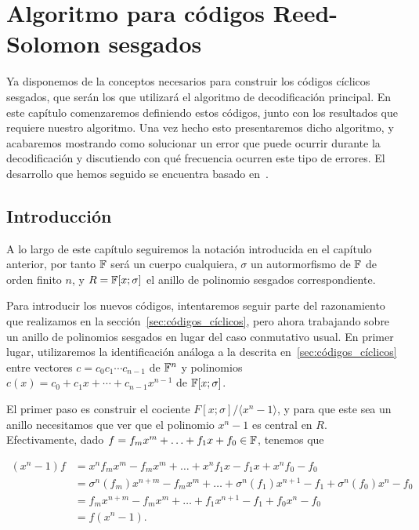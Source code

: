 \chapter{Algoritmo para códigos Reed-Solomon sesgados}%
\label{chap:algoritmo}

Ya disponemos de la conceptos necesarios para construir los códigos cíclicos sesgados, que serán los que utilizará el algoritmo de decodificación principal. En este capítulo comenzaremos definiendo estos códigos, junto con los resultados que requiere nuestro algoritmo. Una vez hecho esto presentaremos dicho algoritmo, y acabaremos mostrando como solucionar un error que puede ocurrir durante la decodificación y discutiendo con qué frecuencia ocurren este tipo de errores. El desarrollo que hemos seguido se encuentra basado en~\cite{sugi}.

\section{Introducción}

A lo largo de este capítulo seguiremos la notación introducida en el capítulo anterior, por tanto \(\mathbb{F}\) será un cuerpo cualquiera,  \(\sigma\) un autormorfismo de  \(\mathbb{F}\) de orden finito  \(n\), y \(R = \mathbb{F}[x;\sigma]\) el anillo de polinomio sesgados correspondiente.

Para introducir los nuevos códigos, intentaremos seguir parte del razonamiento que realizamos en la sección~\ref{sec:códigos_cíclicos}, pero ahora trabajando sobre un anillo de polinomios sesgados en lugar del caso conmutativo usual. En primer lugar, utilizaremos la identificación análoga a la descrita en~\ref{sec:códigos_cíclicos} entre vectores \(c = c_0 c_1\cdots c_{n-1}\) de \(\mathbb{F}^n\) y polinomios \(c(x) = c_0 + c_1x + \cdots + c_{n-1}x^{n-1}\) de \(\mathbb{F}[x;\sigma]\).

El primer paso es construir el cociente \(F[x;\sigma]/\langle x^{n}-1\rangle\), y para que este sea un anillo necesitamos que ver que el polinomio \(x^{n} - 1\) es central en \(R\). Efectivamente, dado \(f = f_m x^m + \ldots + f_1x + f_0 \in \mathbb{F}\), tenemos que

\[
\begin{aligned}
(x^n-1)f &= x^n f_m x^m - f_m x^m + \dots + x^n f_1 x - f_1 x + x^n f_0 - f_0 \\
&= \sigma^n(f_m)x^{n+m} - f_m x^m + \dots + \sigma^n(f_1)x^{n+1} - f_1 + \sigma^n(f_0)x^n - f_0\\
&= f_mx^{n+m} - f_m x^m + \dots + f_1x^{n+1} - f_1 + f_0x^n - f_0\\
&= f(x^n -1).
\end{aligned}
\]

